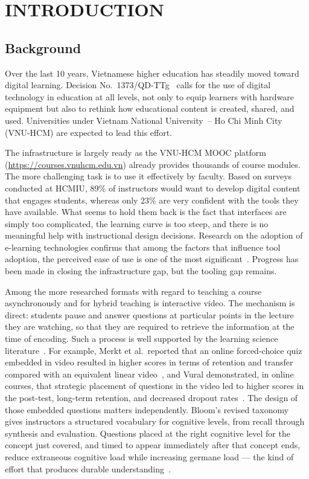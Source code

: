 
\chapter{INTRODUCTION}
\label{ch:intro}
\section{Background}

Over the last 10 years, Vietnamese higher education has steadily moved toward digital learning. Decision No.~1373/QD-TTg~\cite{vietnam_strategy2021} calls for the use of digital technology in education at all levels, not only to equip learners with hardware equipment but also to rethink how educational content is created, shared, and used. Universities under Vietnam National University~-- Ho Chi Minh City (VNU-HCM) are expected to lead this effort.

The infrastructure is largely ready as the VNU-HCM MOOC platform~\cite{vnuhcm_mooc} (\url{https://courses.vnuhcm.edu.vn}) already provides thousands of course modules. The more challenging task is to use it effectively by faculty. Based on surveys conducted at HCMIU, 89\% of instructors would want to develop digital content that engages students, whereas only 23\% are very confident with the tools they have available. What seems to hold them back is the fact that interfaces are simply too complicated, the learning curve is too steep, and there is no meaningful help with instructional design decisions. Research on the adoption of e-learning technologies confirms that among the factors that influence tool adoption, the perceived ease of use is one of the most significant~\cite{hadullo2017}. Progress has been made in closing the infrastructure gap, but the tooling gap remains.

Among the more researched formats with regard to teaching a course asynchronously and for hybrid teaching is interactive video. The mechanism is direct: students pause and answer questions at particular points in the lecture they are watching, so that they are required to retrieve the information at the time of encoding. Such a process is well supported by the learning science literature~\cite{freeman2014}. For example, Merkt et al.\ reported that an online forced-choice quiz embedded in video resulted in higher scores in terms of retention and transfer compared with an equivalent linear video~\cite{merkt2011}, and Vural demonstrated, in online courses, that strategic placement of questions in the video led to higher scores in the post-test, long-term retention, and decreased dropout rates~\cite{vural2013}.
\clearpage
The design of those embedded questions matters independently. Bloom's revised taxonomy~\cite{anderson2001} gives instructors a structured vocabulary for cognitive levels, from recall through synthesis and evaluation. Questions placed at the right cognitive level for the concept just covered, and timed to appear immediately after that concept ends, reduce extraneous cognitive load while increasing germane load --- the kind of effort that produces durable understanding~\cite{sweller1988,chandler1991,paas2003}.


